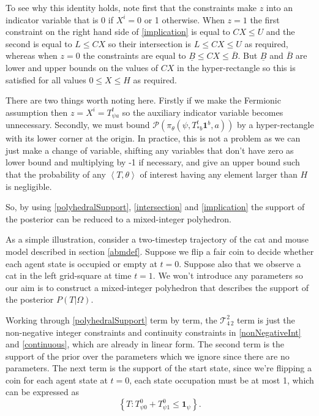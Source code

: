 \documentclass{article}
\begin{document}
To see why this identity holds, note first that the constraints make $z$ into an indicator variable that is 0 if $X^i=0$ or 1 otherwise. When $z=1$ the first constraint on the right hand side of \eqref{implication} is equal to $CX \le U$ and the second is equal to $L \le CX$ so their intersection is $L \le  CX \le U$ as required, whereas when $z=0$ the constraints are equal to $\underline{B} \le CX \le \overline{B}$. But $\underline{B}$ and $\overline{B}$ are lower and upper bounds on the values of $CX$ in the hyper-rectangle so this is satisfied for all values $0 \le X \le H$ as required. 

There are two things worth noting here. Firstly if we make the Fermionic assumption then $z = X^i = T^t_{\psi a}$ so the auxiliary indicator variable becomes unnecessary. Secondly, we must bound $\mathcal{P}(\pi_\theta(\psi,T^t_{*b}\mathbf{1}^b,a))$ by a hyper-rectangle with its lower corner at the origin. In practice, this is not a problem as we can just make a change of variable, shifting any variables that don't have zero as lower bound and multiplying by -1 if necessary, and give an upper bound such that the probability of any $\left<T,\theta\right>$ of interest having any element larger than $H$ is negligible.

So, by using \eqref{polyhedralSupport}, \eqref{intersection} and \eqref{implication} the support of the posterior can be reduced to a mixed-integer polyhedron.

As a simple illustration, consider a two-timestep trajectory of the cat and mouse model described in section \ref{abmdef}. Suppose we flip a fair coin to decide whether each agent state is occupied or empty at $t=0$. Suppose also that we observe a cat in the left grid-square at time $t=1$. We won't introduce any parameters so our aim is to construct a mixed-integer polyhedron that describes the support of the posterior $P(T|\Omega)$.

Working through \eqref{polyhedralSupport} term by term, the $\mathcal{T}^2_{4\,2}$ term is just the non-negative integer constraints and continuity constraints in \eqref{nonNegativeInt} and \eqref{continuous}, which are already in linear form. The second term is the support of the prior over the parameters which we ignore since there are no parameters. The next term is the support of the start state, since we're flipping a coin for each agent state at $t=0$, each state occupation must be at most 1, which can be expressed as
\[
\left\{T:T^0_{\psi 0} + T^0_{\psi 1} \le \mathbf{1}_{\psi}\right\}.
\]
\end{document}
